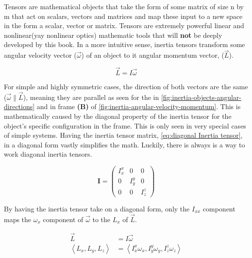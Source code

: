 \documentclass[11pt,a4paper]{book}
\begin{document}
			Tensors are mathematical objects that take the form of some matrix of size n by m that act on scalars, vectors and matrices and map these input to a new space in the form a scalar, vector or matrix. Tensors are extremely powerful linear and nonlinear(yay nonlinear optics) mathematic tools that will \textbf{not} be deeply developed by this book. In a more intuitive sense, inertia tensors transform some angular velocity vector ($\vec{\omega}$) of an object to it angular momentum vector, ($\vec{L}$).
			
			\begin{equation}
				\label{eq:angular momentu}
				\vec{L}=I\vec{\omega}
			\end{equation}		
			
			\noindent
			For simple and highly symmetric cases, the direction of both vectors are the same ($\vec{\omega} \parallel \vec{L}$), meaning they are parallel as seen for the  in \autoref{fig:inertia-objects-angular-directions} and in frame \textbf{(B)} of \autoref{fig:inertia-angular-velocity-momentum}. This is mathematically caused by the diagonal property of the inertia tensor for the object's specific configuration in the frame. This is only seen in very special cases of simple systems. Having the inertia tensor matrix, \autoref{eq:diagonal Inertia tensor}, in a diagonal form vastly simplifies the math. Luckily, there is always is a way to work diagonal inertia tensors.

			\begin{equation}
				\label{eq:diagonal Inertia tensor}
				\textbf{I} =
					\begin{pmatrix}
					I_{x}^x & 0 & 0 \\
					0 & I_{y}^y & 0\\
					0 & 0 & I_{z}^z
					\end{pmatrix} 
			\end{equation}	
			
			\noindent
			By having the inertia tensor take on a diagonal form, only the $I_{xx}$ component maps the $\omega_x$ component of $\vec{\omega}$ to the $L_x$ of $\vec{L}$. 
			
			\begin{equation}
				\begin{split}
				\label{eq:diagonal inertia tensor simplification}
				\vec{L}&=I\vec{\omega} \\
				\left\langle L_x, L_y, L_z \right\rangle& = \left\langle I_{x}^x \omega_x, I_{y}^y \omega_y, I_{z}^z \omega_z \right\rangle
				\end{split}
			\end{equation}
			
\end{document}
